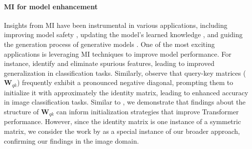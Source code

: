 \paragraph{MI for model enhancement}

Insights from MI have been instrumental in various applications, including improving model safety \citep{Belrose_Furman_Smith_Halawi_Ostrovsky_McKinney_Biderman_Steinhardt_2023}, updating the model's learned knowledge \citep{Meng_Bau_Andonian_Belinkov_2022}, and guiding the generation process of generative models \citep{Geva_Caciularu_2022}.
%
One of the most exciting applications is leveraging MI techniques to improve model performance.
For instance, \citep{Marks_Rager_Michaud_Belinkov_Bau_Mueller_2024} identify and eliminate spurious features, leading to improved generalization in classification tasks.
%
Similarly, \citep{trockman_mimetic_2023} observe that query-key matrices ($\bm{W}_{qk}$) frequently exhibit a pronounced negative diagonal, prompting them to initialize it with approximately the identity matrix, leading to enhanced accuracy in image classification tasks.
%
Similar to \citep{trockman_mimetic_2023}, we demonstrate that findings about the structure of $\bm{W}_{qk}$  can inform initialization strategies that improve Transformer performance. However, since the identity matrix is one instance of a symmetric matrix, we consider the work by \citep{trockman_mimetic_2023} as a special instance of our broader approach, confirming our findings in the image domain.